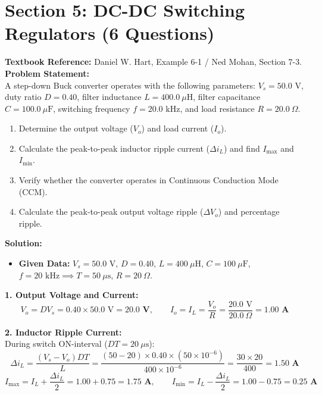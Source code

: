 \documentclass[10pt,a4paper]{article}
\begin{document}
\section*{Section 5: DC-DC Switching Regulators (6 Questions)}

\begin{tcolorbox}[qbox, title={Question 10: Buck Converter Analysis in Continuous Conduction Mode (CCM)}]
\textbf{Textbook Reference:} Daniel W. Hart, Example 6-1 / Ned Mohan, Section 7-3.\\[1mm]
\textbf{Problem Statement:}\\
A step-down Buck converter operates with the following parameters:
$V_s = 50.0\text{ V}$, duty ratio $D = 0.40$, filter inductance $L = 400.0\ \mu\text{H}$, filter capacitance $C = 100.0\ \mu\text{F}$, switching frequency $f = 20.0\text{ kHz}$, and load resistance $R = 20.0\ \Omega$.
\begin{enumerate}
  \item Determine the output voltage ($V_o$) and load current ($I_o$).
  \item Calculate the peak-to-peak inductor ripple current ($\Delta i_L$) and find $I_{\max}$ and $I_{\min}$.
  \item Verify whether the converter operates in Continuous Conduction Mode (CCM).
  \item Calculate the peak-to-peak output voltage ripple ($\Delta V_o$) and percentage ripple.
\end{enumerate}
\end{tcolorbox}

\vspace{1mm}
\noindent\textbf{\textcolor{accentteal}{Solution:}}
\begin{itemize}
  \item \textbf{Given Data:} $V_s = 50.0\text{ V}$, $D = 0.40$, $L = 400\ \mu\text{H}$, $C = 100\ \mu\text{F}$, $f = 20\text{ kHz} \implies T = 50\ \mu\text{s}$, $R = 20\ \Omega$.
\end{itemize}

\noindent\textbf{1. Output Voltage and Current:}\\
\[
V_o = D V_s = 0.40 \times 50.0\text{ V} = \mathbf{20.0\text{ V}}, \qquad I_o = I_L = \frac{V_o}{R} = \frac{20.0\text{ V}}{20.0\ \Omega} = \mathbf{1.00\text{ A}}
\]

\noindent\textbf{2. Inductor Ripple Current:}\\
During switch ON-interval ($D T = 20\ \mu\text{s}$):
\[
\Delta i_L = \frac{(V_s - V_o) D T}{L} = \frac{(50 - 20) \times 0.40 \times (50 \times 10^{-6})}{400 \times 10^{-6}} = \frac{30 \times 20}{400} = \mathbf{1.50\text{ A}}
\]
\[
I_{\max} = I_L + \frac{\Delta i_L}{2} = 1.00 + 0.75 = \mathbf{1.75\text{ A}}, \qquad I_{\min} = I_L - \frac{\Delta i_L}{2} = 1.00 - 0.75 = \mathbf{0.25\text{ A}}
\]
\end{document}

